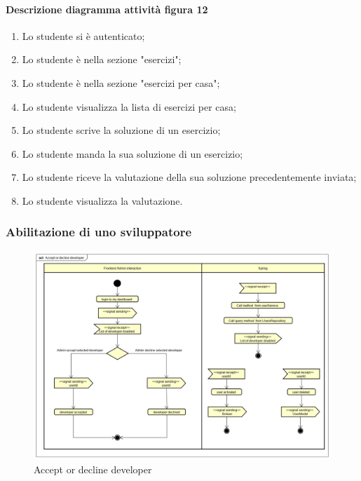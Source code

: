 \paragraph{Descrizione diagramma attività figura 12}
\begin{enumerate}
\item Lo studente si è autenticato;
\item Lo studente è nella sezione "esercizi"; 
\item Lo studente è nella sezione "esercizi per casa";
\item Lo studente visualizza la lista di esercizi per casa; 
\item Lo studente scrive la soluzione di un esercizio;
\item Lo studente manda la sua soluzione di un esercizio; 
\item Lo studente riceve la valutazione della sua soluzione precedentemente inviata; 
\item Lo studente visualizza la valutazione.
\end{enumerate}


\subsubsection{Abilitazione di uno sviluppatore}
\begin{figure}[H]
\centering
\includegraphics[width=17cm, keepaspectratio]{img/Accept-or-decline-developer.png} 
\caption{Accept or decline developer}
\end{figure}

